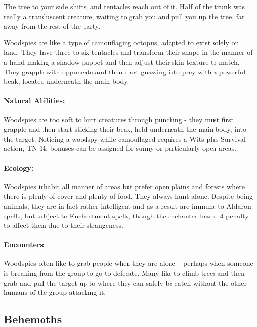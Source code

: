 \label{woodspy}
\woodspy


\begin{boxtext}

	The tree to your side shifts, and tentacles reach out of it.  Half of the trunk was really a transluscent creature, waiting to grab you and pull you up the tree, far away from the rest of the party.

\end{boxtext}

Woodspies are like a type of camouflaging octopus, adapted to exist solely on land.  They have three to six tentacles and transform their shape in the manner of a hand making a shadow puppet and then adjust their skin-texture to match.  They grapple with opponents and then start gnawing into prey with a powerful beak, located underneath the main body.

\paragraph{Natural Abilities:} Woodspies are too soft to hurt creatures through punching - they must first grapple and then start sticking their beak, held underneath the main body, into the target.  Noticing a woodspy while camouflaged requires a Wits plus Survival action, TN 14; bonuses can be assigned for sunny or particularly open areas.

\paragraph{Ecology:} Woodspies inhabit all manner of areas but prefer open plains and forests where there is plenty of cover and plenty of food.  They always hunt alone.  Despite being animals, they are in fact rather intelligent and as a result are immune to Aldaron spells, but subject to Enchantment spells, though the enchanter has a -4 penalty to affect them due to their strangeness.

\paragraph{Encounters:} Woodspies often like to grab people when they are alone -- perhaps when someone is breaking from the group to go to defecate.  Many like to climb trees and then grab and pull the target up to where they can safely be eaten without the other humans of the group attacking it.

\subsection{Behemoths}

